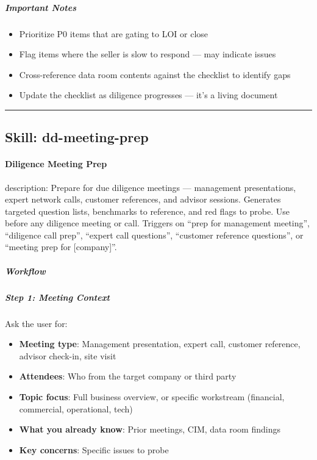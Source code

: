 \documentclass[11pt]{article}
\begin{document}
\subparagraph{Important Notes}\mbox{}\par

\begin{itemize}[leftmargin=*,itemsep=2pt,topsep=2pt]
\item {} Prioritize P0 items that are gating to LOI or close
\item {} Flag items where the seller is slow to respond — may indicate issues
\item {} Cross-reference data room contents against the checklist to identify gaps
\item {} Update the checklist as diligence progresses — it's a living document
\end{itemize}

\vspace{0.8em}\hrule\vspace{0.8em}

\subsection{Skill: dd-meeting-prep}\label{file:skills-dd-meeting-prep-SKILL.md}

\paragraph{Diligence Meeting Prep}\mbox{}\par

description: Prepare for due diligence meetings — management presentations, expert network calls, customer references, and advisor sessions. Generates targeted question lists, benchmarks to reference, and red flags to probe. Use before any diligence meeting or call. Triggers on ``prep for management meeting'', ``diligence call prep'', ``expert call questions'', ``customer reference questions'', or ``meeting prep for [company]''.


\subparagraph{Workflow}\mbox{}\par

\subparagraph{Step 1: Meeting Context}\mbox{}\par

Ask the user for:

\begin{itemize}[leftmargin=*,itemsep=2pt,topsep=2pt]
\item {} \textbf{Meeting type}: Management presentation, expert call, customer reference, advisor check-in, site visit
\item {} \textbf{Attendees}: Who from the target company or third party
\item {} \textbf{Topic focus}: Full business overview, or specific workstream (financial, commercial, operational, tech)
\item {} \textbf{What you already know}: Prior meetings, CIM, data room findings
\item {} \textbf{Key concerns}: Specific issues to probe
\end{itemize}
\end{document}
